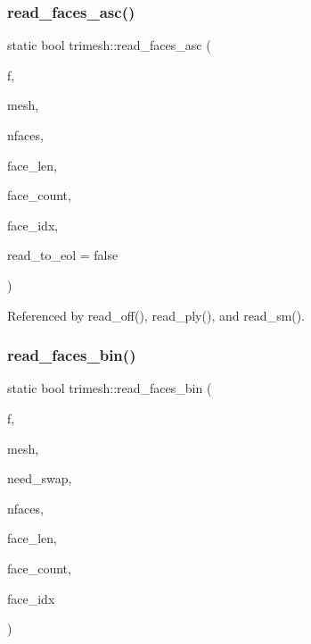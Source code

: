 \subsubsection{\texorpdfstring{read\+\_\+faces\+\_\+asc()}{read\_faces\_asc()}}
{\footnotesize\ttfamily static bool trimesh\+::read\+\_\+faces\+\_\+asc (\begin{DoxyParamCaption}\item[{F\+I\+LE $\ast$}]{f,  }\item[{\hyperlink{classtrimesh_1_1TriMesh}{Tri\+Mesh} $\ast$}]{mesh,  }\item[{int}]{nfaces,  }\item[{int}]{face\+\_\+len,  }\item[{int}]{face\+\_\+count,  }\item[{int}]{face\+\_\+idx,  }\item[{bool}]{read\+\_\+to\+\_\+eol = {\ttfamily false} }\end{DoxyParamCaption})\hspace{0.3cm}{\ttfamily [static]}}



Referenced by read\+\_\+off(), read\+\_\+ply(), and read\+\_\+sm().

\mbox{\label{namespacetrimesh_a20fe51f2d1b8a67d83f1131847b1dab5}} 
\subsubsection{\texorpdfstring{read\+\_\+faces\+\_\+bin()}{read\_faces\_bin()}}
{\footnotesize\ttfamily static bool trimesh\+::read\+\_\+faces\+\_\+bin (\begin{DoxyParamCaption}\item[{F\+I\+LE $\ast$}]{f,  }\item[{\hyperlink{classtrimesh_1_1TriMesh}{Tri\+Mesh} $\ast$}]{mesh,  }\item[{bool}]{need\+\_\+swap,  }\item[{int}]{nfaces,  }\item[{int}]{face\+\_\+len,  }\item[{int}]{face\+\_\+count,  }\item[{int}]{face\+\_\+idx }\end{DoxyParamCaption})\hspace{0.3cm}{\ttfamily [static]}}



